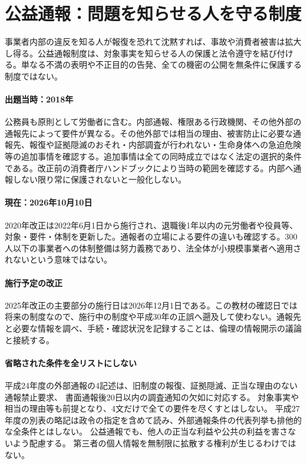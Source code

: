 \section{公益通報：問題を知らせる人を守る制度}
\label{theory:compliance:whistleblower}
事業者内部の違反を知る人が報復を恐れて沈黙すれば、事故や消費者被害は拡大し得る。公益通報制度は、対象事実を知らせる人の保護と法令遵守を結び付ける。単なる不満の表明や不正目的の告発、全ての機密の公開を無条件に保護する制度ではない。

\paragraph{出題当時：2018年}
公務員も原則として労働者に含む。内部通報、権限ある行政機関、その他外部の通報先によって要件が異なる。その他外部では相当の理由、被害防止に必要な通報先、報復や証拠隠滅のおそれ・内部調査が行われない・生命身体への急迫危険等の追加事情を確認する。追加事情は全ての同時成立ではなく法定の選択的条件である。改正前の消費者庁ハンドブックにより当時の範囲を確認する\parencite{caa_handbook_pre2022}。内部へ通報しない限り常に保護されないと一般化しない。

\paragraph{現在：2026年10月10日}
2020年改正は2022年6月1日から施行され、退職後1年以内の元労働者や役員等、対象・要件・体制を更新した。通報者の立場による要件の違いも確認する\parencite{caa_amend2020,caa_current_faq,caa_report_current}。300人以下の事業者への体制整備は努力義務であり、法全体が小規模事業者へ適用されないという意味ではない。

\paragraph{施行予定の改正}
2025年改正の主要部分の施行日は2026年12月1日である\parencite{caa_schedule2026}。この教材の確認日では将来の制度なので、施行中の制度や平成30年の正誤へ遡及して使わない。通報先と必要な情報を調べ、手続・確認状況を記録することは、倫理の情報開示の議論と接続する。

\paragraph{省略された条件を全リストにしない}
平成24年度の外部通報の4記述は、旧制度の報復、証拠隠滅、正当な理由のない通報禁止要求、
書面通報後20日以内の調査通知の欠如に対応する。
対象事実や相当の理由等も前提となり、4文だけで全ての要件を尽くすとはしない。\cite{saf53_whistle_oldfaq}
平成27年度の別表の略記は政令の指定を含めて読み、外部通報条件の代表列挙も排他的な全条件とはしない。
公益通報でも、他人の正当な利益や公共の利益を害さないよう配慮する。
第三者の個人情報を無制限に拡散する権利が生じるわけではない。\cite{caa_handbook_pre2022}

